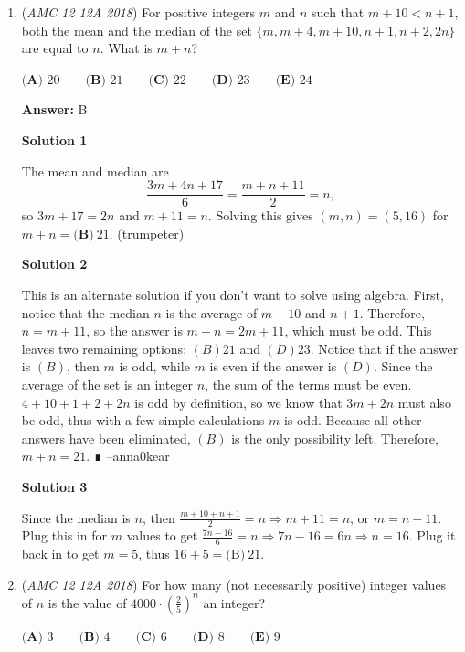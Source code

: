\begin{enumerate}
 


	\item (\textit{AMC 12 12A 2018}) For positive integers $m$ and $n$ such that $m+10<n+1$, both the mean and the median of the set $\{m, m+4, m+10, n+1, n+2, 2n\}$ are equal to $n$. What is $m+n$?


 $\textbf{(A) }20\qquad\textbf{(B) }21\qquad\textbf{(C) }22\qquad\textbf{(D) }23\qquad\textbf{(E) }24$

 \textbf{Answer: }B



\textbf{Solution 1}

The mean and median are 
 \[\frac{3m+4n+17}{6}=\frac{m+n+11}{2}=n,\]so $3m+17=2n$ and $m+11=n$. Solving this gives $\left(m,n\right)=\left(5,16\right)$ for $m+n=\boxed{\textbf{(B)}~21}$. (trumpeter)

 



\textbf{Solution 2}

This is an alternate solution if you don't want to solve using algebra. First, notice that the median $n$ is the average of $m+10$ and $n+1$. Therefore, $n=m+11$, so the answer is $m+n=2m+11$, which must be odd. This leaves two remaining options: ${(B) 21}$ and ${(D) 23}$. Notice that if the answer is $(B)$, then $m$ is odd, while $m$ is even if the answer is $(D)$. Since the average of the set is an integer $n$, the sum of the terms must be even. $4+10+1+2+2n$ is odd by definition, so we know that $3m+2n$ must also be odd, thus with a few simple calculations $m$ is odd. Because all other answers have been eliminated, $(B)$ is the only possibility left. Therefore, $m+n=\boxed{21}$. ∎ --anna0kear

 



\textbf{Solution 3}

Since the median is $n$, then $\frac{m+10+n+1}{2} = n \Rightarrow m+11 = n$, or $m= n-11$. Plug this in for $m$ values to get $\frac{7n-16}{6} = n \Rightarrow 7n-16 = 6n \Rightarrow n= 16$. Plug it back in to get $m = 5$, thus $16 + 5 = \boxed{\text{(B)}~21}$.

 


	\item (\textit{AMC 12 12A 2018}) For how many (not necessarily positive) integer values of $n$ is the value of $4000\cdot \left(\frac{2}{5}\right)^n$ an integer?


 $\textbf{(A) }3 \qquad \textbf{(B) }4 \qquad \textbf{(C) }6 \qquad \textbf{(D) }8 \qquad \textbf{(E) }9 \qquad$


\end{enumerate}
